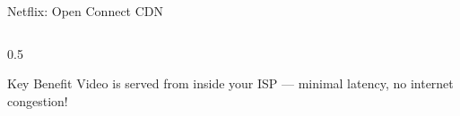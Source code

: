 \documentclass[aspectratio=169,12pt]{beamer}
\begin{document}
\begin{frame}{Netflix: Open Connect CDN}
\begin{columns}
\begin{column}{0.5\textwidth}
\begin{center}
            \end{center}
            
            \vspace{0.2cm}
            \begin{alertblock}{Key Benefit}
                Video is served from inside your ISP --- minimal latency, no internet congestion!
            \end{alertblock}
        \end{column}
    \end{columns}
\end{frame}
\end{document}

